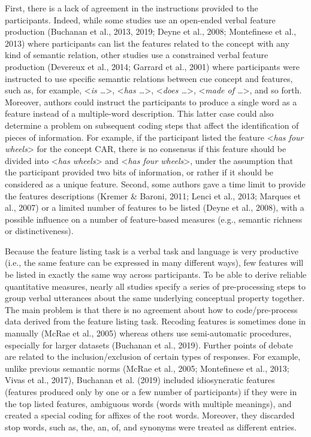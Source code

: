 \documentclass[man]{apa6}
\begin{document}
First, there is a lack of agreement in the instructions provided to the participants. Indeed, while some studies use an open-ended verbal feature production (Buchanan et al., 2013, 2019; Deyne et al., 2008; Montefinese et al., 2013) where participants can list the features related to the concept with any kind of semantic relation, other studies use a constrained verbal feature production (Devereux et al., 2014; Garrard et al., 2001) where participants were instructed to use specific semantic relations between cue concept and features, such as, for example, \textless{}\emph{is \ldots{}}\textgreater{}, \textless{}\emph{has \ldots{}}\textgreater{}, \textless{}\emph{does \ldots{}}\textgreater{}, \textless{}\emph{made of \ldots{}}\textgreater{}, and so forth. Moreover, authors could instruct the participants to produce a single word as a feature instead of a multiple-word description. This latter case could also determine a problem on subsequent coding steps that affect the identification of pieces of information. For example, if the participant listed the feature \textless{}\emph{has four wheels}\textgreater{} for the concept CAR, there is no consensus if this feature should be divided into \textless{}\emph{has wheels}\textgreater{} and \textless{}\emph{has four wheels}\textgreater{}, under the assumption that the participant provided two bits of information, or rather if it should be considered as a unique feature. Second, some authors gave a time limit to provide the features descriptions (Kremer \& Baroni, 2011; Lenci et al., 2013; Marques et al., 2007) or a limited number of features to be listed (Deyne et al., 2008), with a possible influence on a number of feature-based measures (e.g., semantic richness or distinctiveness).

Because the feature listing task is a verbal task and language is very productive (i.e., the same feature can be expressed in many different ways), few features will be listed in exactly the same way across participants. To be able to derive reliable quantitative measures, nearly all studies specify a series of pre-processing steps to group verbal utterances about the same underlying conceptual property together. The main problem is that there is no agreement about how to code/pre-process data derived from the feature listing task. Recoding features is sometimes done in manually (McRae et al., 2005) whereas others use semi-automatic procedures, especially for larger datasets (Buchanan et al., 2019). Further points of debate are related to the inclusion/exclusion of certain types of responses. For example, unlike previous semantic norms (McRae et al., 2005; Montefinese et al., 2013; Vivas et al., 2017), Buchanan et al. (2019) included idiosyncratic features (features produced only by one or a few number of participants) if they were in the top listed features, ambiguous words (words with multiple meanings), and created a special coding for affixes of the root words. Moreover, they discarded stop words, such as, the, an, of, and synonyms were treated as different entries.
\end{document}
